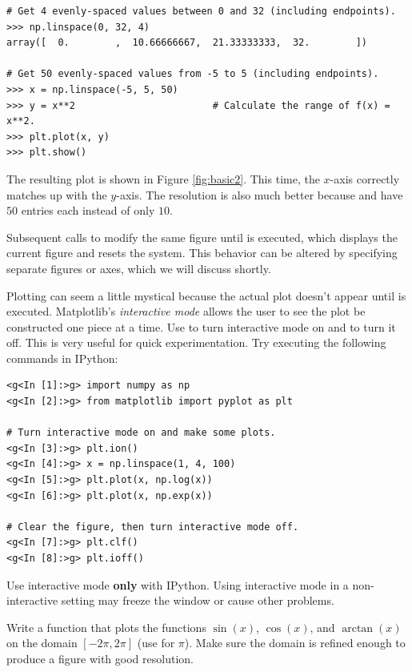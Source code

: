 \begin{lstlisting}
# Get 4 evenly-spaced values between 0 and 32 (including endpoints).
>>> np.linspace(0, 32, 4)
array([  0.        ,  10.66666667,  21.33333333,  32.        ])

# Get 50 evenly-spaced values from -5 to 5 (including endpoints).
>>> x = np.linspace(-5, 5, 50)
>>> y = x**2                        # Calculate the range of f(x) = x**2.
>>> plt.plot(x, y)
>>> plt.show()
\end{lstlisting}

The resulting plot is shown in Figure \ref{fig:basic2}.
This time, the $x$-axis correctly matches up with the $y$-axis.
The resolution is also much better because  and  have $50$ entries each instead of only $10$.

Subsequent calls to  modify the same figure until  is executed, which displays the current figure and resets the system.
This behavior can be altered by specifying separate figures or axes, which we will discuss shortly.

\begin{info} %
Plotting can seem a little mystical because the actual plot doesn't appear until  is executed.
Matplotlib's \emph{interactive mode} allows the user to see the plot be constructed one piece at a time.
Use  to turn interactive mode on and  to turn it off.
This is very useful for quick experimentation.
Try executing the following commands in IPython:

\begin{lstlisting}
<g<In [1]:>g> import numpy as np
<g<In [2]:>g> from matplotlib import pyplot as plt

# Turn interactive mode on and make some plots.
<g<In [3]:>g> plt.ion()
<g<In [4]:>g> x = np.linspace(1, 4, 100)
<g<In [5]:>g> plt.plot(x, np.log(x))
<g<In [6]:>g> plt.plot(x, np.exp(x))

# Clear the figure, then turn interactive mode off.
<g<In [7]:>g> plt.clf()
<g<In [8]:>g> plt.ioff()
\end{lstlisting}

Use interactive mode \textbf{only} with IPython.
Using interactive mode in a non-interactive setting may freeze the window or cause other problems.
\end{info}

\begin{problem} %
Write a function that plots the functions $\sin(x)$, $\cos(x)$, and $\arctan(x)$ on the domain $[-2\pi, 2\pi]$ (use  for $\pi$).
Make sure the domain is refined enough to produce a figure with good resolution.
\end{problem}


